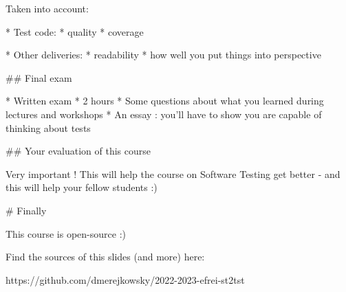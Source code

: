 Taken into account:

* Test code:
    * quality
    * coverage

* Other deliveries:
  * readability
  * how well you put things into perspective

## Final exam

* Written exam
* 2 hours
* Some questions about what you learned during lectures and workshops
* An essay : you'll have to show you are capable of thinking about tests

## Your evaluation of this course

Very important ! This will help the course on Software Testing get
better - and this will help your fellow students :)

# Finally

This course is open-source :)

Find the sources of this slides (and more) here:

https://github.com/dmerejkowsky/2022-2023-efrei-st2tst
